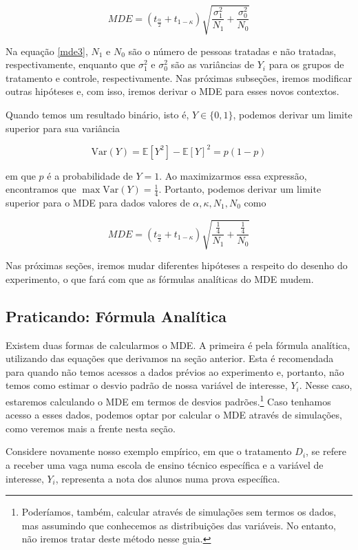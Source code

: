 \begin{equation}\label{mde3}
    MDE = (t_{\frac{\alpha}{2}} + t_{1-\kappa})\sqrt{\frac{\sigma^2_1}{N_1} + \frac{\sigma^2_0}{N_0}}
\end{equation}

Na equação \ref{mde3}, $N_1$ e $N_0$ são o número de pessoas tratadas e não tratadas, respectivamente, enquanto que $\sigma_1^2$ e $\sigma_0^2$ são as variâncias de $Y_i$ para os grupos de tratamento e controle, respectivamente. Nas próximas subseções, iremos modificar outras hipóteses e, com isso, iremos derivar o MDE para esses novos contextos.

Quando temos um resultado binário, isto é, $Y \in \{0,1\}$, podemos derivar um limite superior para sua variância

    $$
    \mathrm{Var}(Y) = \mathbb{E}[Y^2] - \mathbb{E}[Y]^2 = p(1-p)
    $$

    em que $p$ é a probabilidade de $Y = 1$. Ao maximizarmos essa expressão, encontramos que $\max \mathrm{Var}(Y) = \frac{1}{4}$. Portanto, podemos derivar um limite superior para o MDE para dados valores de $\alpha, \kappa, N_1, N_0$ como

    $$
    MDE = (t_{\frac{\alpha}{2}} + t_{1-\kappa})\sqrt{\frac{\frac{1}{4}}{N_1} + \frac{\frac{1}{4}}{N_0}}
    $$

Nas próximas seções, iremos mudar diferentes hipóteses a respeito do desenho do experimento, o que fará com que as fórmulas analíticas do MDE mudem.

\subsection{\sc Praticando: Fórmula Analítica}\label{rct_fa}

Existem duas formas de calcularmos o MDE. A primeira é pela fórmula analítica, utilizando das equações que derivamos na seção anterior. Esta é recomendada para quando não temos acessos a dados prévios ao experimento e, portanto, não temos como estimar o desvio padrão de nossa variável de interesse, $Y_i$. Nesse caso, estaremos calculando o MDE em termos de desvios padrões.\footnote{Poderíamos, também, calcular através de simulações sem termos os dados, mas assumindo que conhecemos as distribuições das variáveis. No entanto, não iremos tratar deste método nesse guia.} Caso tenhamos acesso a esses dados, podemos optar por calcular o MDE através de simulações, como veremos mais a frente nesta seção. 

Considere novamente nosso exemplo empírico, em que o tratamento $D_i$, se refere a receber uma vaga numa escola de ensino técnico específica e a variável de interesse, $Y_i$, representa a nota dos alunos numa prova específica. 

